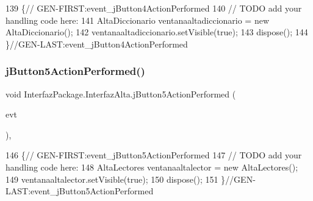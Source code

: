 \begin{DoxyCode}
139                                                                          \{\textcolor{comment}{//
      GEN-FIRST:event\_jButton4ActionPerformed}
140         \textcolor{comment}{// TODO add your handling code here:}
141         AltaDiccionario ventanaaltadiccionario = \textcolor{keyword}{new} AltaDiccionario();
142         ventanaaltadiccionario.setVisible(\textcolor{keyword}{true});
143         dispose();
144     \}\textcolor{comment}{//GEN-LAST:event\_jButton4ActionPerformed}
\end{DoxyCode}
\mbox{\label{class_interfaz_package_1_1_interfaz_alta_a6716900585168bc0e5176c89fe07efa7}} 
\subsubsection{\texorpdfstring{j\+Button5\+Action\+Performed()}{jButton5ActionPerformed()}}
{\footnotesize\ttfamily void Interfaz\+Package.\+Interfaz\+Alta.\+j\+Button5\+Action\+Performed (\begin{DoxyParamCaption}\item[{java.\+awt.\+event.\+Action\+Event}]{evt }\end{DoxyParamCaption})\hspace{0.3cm}{\ttfamily [inline]}, {\ttfamily [private]}}


\begin{DoxyCode}
146                                                                          \{\textcolor{comment}{//
      GEN-FIRST:event\_jButton5ActionPerformed}
147         \textcolor{comment}{// TODO add your handling code here:}
148         AltaLectores ventanaaltalector = \textcolor{keyword}{new} AltaLectores();
149         ventanaaltalector.setVisible(\textcolor{keyword}{true});
150         dispose();
151     \}\textcolor{comment}{//GEN-LAST:event\_jButton5ActionPerformed}
\end{DoxyCode}
\mbox{\label{class_interfaz_package_1_1_interfaz_alta_ad18e438644c48cb52567b3878609a129}} 
